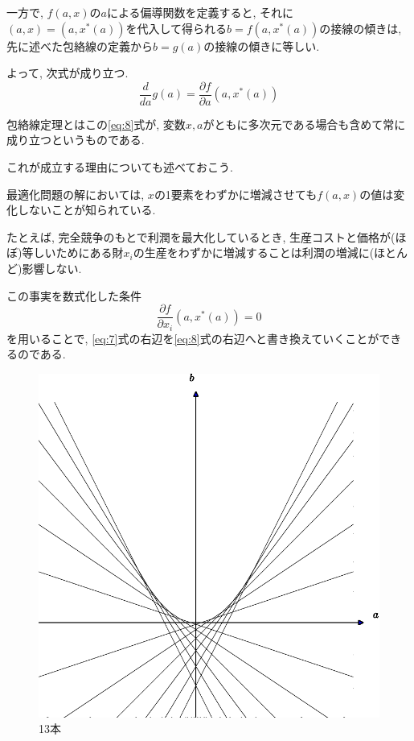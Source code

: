 \documentclass[11pt,a4j,fleqn]{jarticle}
\begin{document}
一方で, $f(a,x)$の$a$による偏導関数を定義すると, それに$(a,x)=(a,x^*(a))$を代入して得られる$b=f(a,x^* (a))$の接線の傾きは, 先に述べた包絡線の定義から$b=g(a)$の接線の傾きに等しい.

よって, 次式が成り立つ.
\begin{equation}
\frac{d}{da}g(a)=\frac{\partial f}{\partial a}(a, x^* (a)) \label{eq:8}
\end{equation}

包絡線定理とはこの\eqref{eq:8}式が, 変数$x,a$がともに多次元である場合も含めて常に成り立つというものである.

これが成立する理由についても述べておこう.

最適化問題の解においては, $x$の1要素をわずかに増減させても$f(a,x)$の値は変化しないことが知られている.

たとえば, 完全競争のもとで利潤を最大化しているとき, 生産コストと価格が(ほぼ)等しいためにある財$x_i$の生産をわずかに増減することは利潤の増減に(ほとんど)影響しない.

この事実を数式化した条件
\begin{equation*}
\frac{\partial f}{\partial x_i}(a,x^* (a))=0
\end{equation*}
を用いることで, \eqref{eq:7}式の右辺を\eqref{eq:8}式の右辺へと書き換えていくことができるのである.
\begin{figure}[p]
 \centering
 \includegraphics[scale=0.7]{envelope0.pdf}
 \caption{13本}
 \label{fig:1}
\end{figure}
\end{document}
